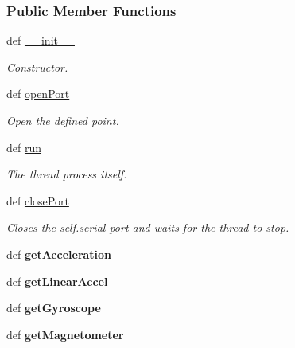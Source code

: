 \subsubsection*{Public Member Functions}
\begin{DoxyCompactItemize}
\item 
def \hyperlink{classserial_thread_1_1_serial_thread_a874fcf63db303c69c887b2703d3d1660}{\-\_\-\-\_\-init\-\_\-\-\_\-}
\begin{DoxyCompactList}\small\item\em Constructor. \end{DoxyCompactList}\item 
def \hyperlink{classserial_thread_1_1_serial_thread_abdd58ace4dd79db7f66d15070b2bab5d}{open\-Port}
\begin{DoxyCompactList}\small\item\em Open the defined point. \end{DoxyCompactList}\item 
def \hyperlink{classserial_thread_1_1_serial_thread_a0a71cf4401bb05dbca2b5bf907a22ef2}{run}
\begin{DoxyCompactList}\small\item\em The thread process itself. \end{DoxyCompactList}\item 
def \hyperlink{classserial_thread_1_1_serial_thread_acb2921ccd41a8f36c6503cd996e6e779}{close\-Port}
\begin{DoxyCompactList}\small\item\em Closes the self.\-serial port and waits for the thread to stop. \end{DoxyCompactList}\item 
\hypertarget{classserial_thread_1_1_serial_thread_a7eeeb62dfd322b82e45bac063c895224}{def {\bfseries get\-Acceleration}}\label{classserial_thread_1_1_serial_thread_a7eeeb62dfd322b82e45bac063c895224}

\item 
\hypertarget{classserial_thread_1_1_serial_thread_a1ca654be4f1379aa946c0b523c50ff20}{def {\bfseries get\-Linear\-Accel}}\label{classserial_thread_1_1_serial_thread_a1ca654be4f1379aa946c0b523c50ff20}

\item 
\hypertarget{classserial_thread_1_1_serial_thread_aeab53c96eb90620f814bd189e39a6f52}{def {\bfseries get\-Gyroscope}}\label{classserial_thread_1_1_serial_thread_aeab53c96eb90620f814bd189e39a6f52}

\item 
\hypertarget{classserial_thread_1_1_serial_thread_a9a1638fb77d452d04204e745f20a5436}{def {\bfseries get\-Magnetometer}}\label{classserial_thread_1_1_serial_thread_a9a1638fb77d452d04204e745f20a5436}


\end{DoxyCompactItemize}
